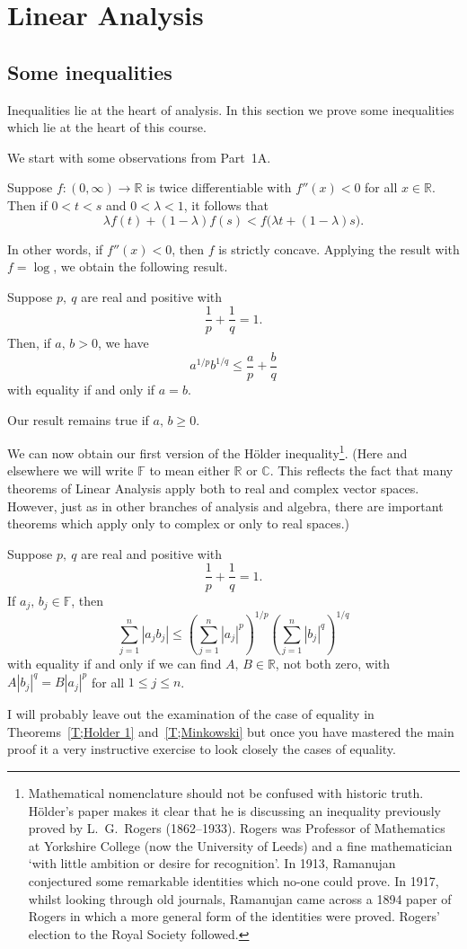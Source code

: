 \chapter{Linear Analysis}

\section{Some inequalities} Inequalities lie at the heart of analysis.
In this section we prove some inequalities which lie at
the heart of this course.

We start with some observations from Part~1A.
\begin{exercise} Suppose $f:(0,\infty)\rightarrow{\mathbb R}$
is twice differentiable with $f''(x)<0$ for all $x\in{\mathbb R}$.
Then if $0<t<s$ and $0<\lambda<1$, it follows that
\[\lambda f(t)+(1-\lambda) f(s)<f\big(\lambda t+(1-\lambda)s\big).\]
\end{exercise}
In other words, if $f''(x)<0$, then $f$ is strictly concave.
Applying the result with $f=\log$, we obtain the following result.
\begin{lemma} Suppose $p,\ q$ are real and positive with
\[\frac{1}{p}+\frac{1}{q}=1.\]
Then, if $a,\,b>0$, we have
\[a^{1/p}b^{1/q}\leq \frac{a}{p}+\frac{b}{q}\]
with equality if and only if $a=b$.

Our result remains true if $a,\,b\geq 0$.
\end{lemma}
We can now obtain our first version of the
H{\"o}lder inequality\footnote{Mathematical 
nomenclature should not be confused
with historic truth. H\"{o}lder's paper makes it clear
that he is discussing an inequality previously proved by
L.~G.~Rogers (1862--1933). Rogers was Professor of Mathematics at Yorkshire
College (now the University of Leeds) and a fine mathematician
`with little ambition or desire for recognition'. In 1913,
Ramanujan conjectured some remarkable identities which
no-one could prove. In 1917, whilst looking through old journals,
Ramanujan came across a 1894 paper of Rogers in which
a more general form of the identities were proved.
Rogers' election to the Royal Society followed.}.
(Here and elsewhere
we will write ${\mathbb F}$ to mean either
${\mathbb R}$ or ${\mathbb C}$. This reflects the
fact that many theorems of Linear Analysis
apply both to real and complex vector spaces. However, just as in
other branches of analysis and algebra, there are important
theorems which apply only to complex or only to real spaces.)
\begin{theorem}\label{T;Holder 1} Suppose $p,\ q$ are real and positive with
\[\frac{1}{p}+\frac{1}{q}=1.\]
If $a_{j},\,b_{j}\in{\mathbb F}$, then
\[\sum_{j=1}^{n}|a_{j}b_{j}|\leq
\left(\sum_{j=1}^{n}|a_{j}|^{p}\right)^{1/p}
\left(\sum_{j=1}^{n}|b_{j}|^{q}\right)^{1/q}\]
with equality if and only if we can find $A,\,B\in{\mathbb R}$,
not both zero,
with $A|b_{j}|^{q}=B|a_{j}|^{p}$ for all $1\leq j\leq n$.
\end{theorem}
I will probably leave out the examination of the case of equality
in Theorems~\ref{T;Holder 1} and~\ref{T;Minkowski} but once
you have mastered the main proof it a very instructive exercise
to look closely the cases of equality.

